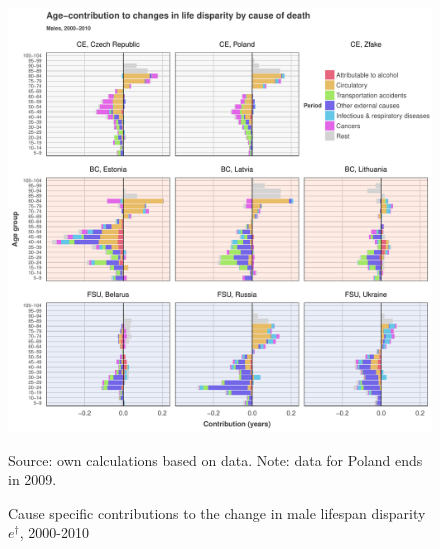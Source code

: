 \documentclass{article}
\begin{document}
\begin{figure}[h!]
\caption{Cause specific contributions to the change in  male lifespan disparity  $e^\dagger$, 2000-2010}
\label{Males_causes_2000}
\centering
\begin{center}
\includegraphics[scale=.70]{Figures/Cause_ed_decomp_Males_2.pdf}
\end{center}
Source: own calculations based on \citet{HcO} data. Note: data for Poland ends in 2009.
\end{figure}





%
\end{document}
